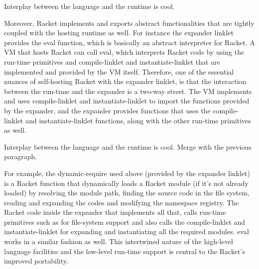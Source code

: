 		\begin{paragraph-here}
			Interplay between the language and the runtime is cool.


			Moreover, Racket implements and exports abstract functionalities that are tightly coupled with the hosting runtime as well. For instance the expander linklet provides the eval function, which is basically an abstract interpreter for Racket. A VM that hosts Racket can call eval, which interprets Racket code by using the run-time primitives and compile-linklet and instantiate-linklet that are implemented and provided by the VM itself. Therefore, one of the essential nuances of self-hosting Racket with the expander linklet, is that the interaction between the run-time and the expander is a two-way street. The VM implements and uses compile-linklet and instantiate-linklet to import the functions provided by the expander, and the expander provides functions that uses the compile-linklet and instantiate-linklet functions, along with the other run-time primitives as well.
		\end{paragraph-here}

		\begin{paragraph-here}
			Interplay between the language and the runtime is cool. Merge with the previous paragraph.

			For example, the dynamic-require used above (provided by the expander linklet) is a Racket function that dynamically loads a Racket module (if it’s not already loaded) by resolving the module path, finding the source code in the file system, reading and expanding the codes and modifying the namespace registry. The Racket code inside the expander that implements all that, calls run-time primitives such as for file-system support and also calls the compile-linklet and instantiate-linklet for expanding and instantiating all the required modules. eval works in a similar fashion as well. This intertwined nature of the high-level language facilities and the low-level run-time support is central to the Racket’s improved portability.
		\end{paragraph-here}



